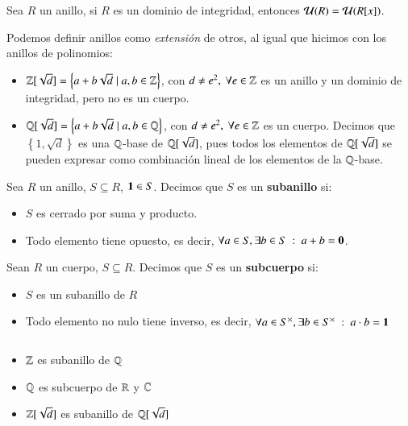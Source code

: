 \begin{pro}
    Sea $R$ un anillo, si $R$ es un dominio de integridad, entonces $\mathcal{U}(R) = \mathcal{U}(R[x])$.
\end{pro}

\begin{obs}
    Podemos definir anillos como \textit{extensión} de otros, al igual que hicimos con los anillos de polinomios:\\
    \begin{itemize}
        \item $\mathbb{Z}[\sqrt{d}] = \left\{a + b\sqrt{d} \mid a,b \in \mathbb{Z} \right\}$, con $d \neq e^2,\ \forall e \in \mathbb{Z}$ es un anillo y un dominio de integridad, pero no es un cuerpo.
        \item $\mathbb{Q}[\sqrt{d}] = \left\{a + b\sqrt{d} \mid a,b \in \mathbb{Q} \right\}$, con $d \neq e^2,\ \forall e \in \mathbb{Z}$ es un cuerpo. Decimos que $\left\{ 1, \sqrt{d} \right\}$ es una $\mathbb{Q}$-base de $\mathbb{Q}[\sqrt{d}]$, pues todos los elementos de $\mathbb{Q}[\sqrt{d}]$ se pueden expresar como combinación lineal de los elementos de la $\mathbb{Q}$-base.
    \end{itemize}
\end{obs}

\begin{dfn}[Subanillo]
    Sea $R$ un anillo, $S \subseteq R$, $\mathbf{1} \in S$. Decimos que $S$ es un \textbf{subanillo} si:
    \begin{itemize}
        \item $S$ es cerrado por suma y producto.
        \item Todo elemento tiene opuesto, es decir, $\forall a \in S, \exists b \in S\ :\ a + b = \mathbf{0}$.
    \end{itemize}
\end{dfn}

\begin{dfn}[Subcuerpo]
    Sean $R$ un cuerpo, $S \subseteq R$. Decimos que $S$ es un \textbf{subcuerpo} si:
    \begin{itemize}
        \item $S$ es un subanillo de $R$
        \item Todo elemento no nulo tiene inverso, es decir, $\forall a \in S^{\times}, \exists b \in S^{\times}\ :\ a \cdot b = \1$
    \end{itemize}
\end{dfn}

\begin{eg}$ $
    \begin{itemize}
        \item $\mathbb{Z}$ es subanillo de $\mathbb{Q}$
        \item $\mathbb{Q}$ es subcuerpo de $\mathbb{R}$ y $\mathbb{C}$
        \item $\mathbb{Z}[\sqrt{d}]$ es subanillo de $\mathbb{Q}[\sqrt{d}]$
    \end{itemize}
\end{eg}

